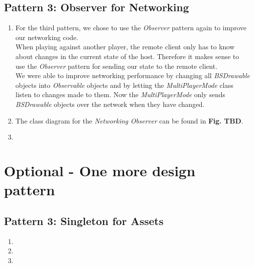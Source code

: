 \documentclass[a4paper,11pt]{article}
\begin{document}
\subsection{Pattern 3: Observer for Networking}
\begin{enumerate}
\item For the third pattern, we chose to use the \textit{Observer} pattern again to improve our networking code. \\
When playing against another player, the remote client only has to know about changes in the current state of the host.
Therefore it makes sense to use the \textit{Observer} pattern for sending our state to the remote client. \\
We were able to improve networking performance by changing all \textit{BSDrawable} objects into \textit{Observable} objects and by letting the \textit{MultiPlayerMode} class listen to changes made to them.
Now the \textit{MultiPlayerMode} only sends \textit{BSDrawable} objects over the network when they have changed.
\item The class diagram for the \textit{Networking Observer} can be found in \textbf{Fig. TBD}. \\
\begin{minipage}{\linewidth}
\end{minipage}
\item
\end{enumerate}

\section{Optional - One more design pattern}
\subsection{Pattern 3: Singleton for Assets}
\begin{enumerate}
\item
\item
\item
\end{enumerate}
\end{document}
